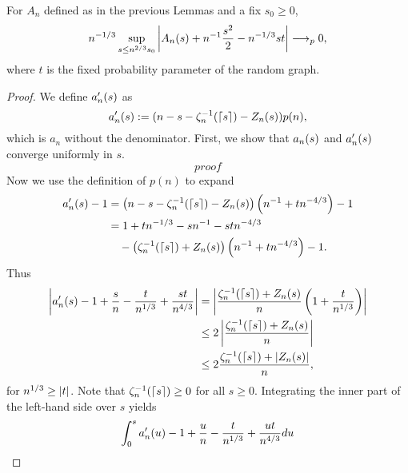 \begin{lemma} \label{L: limit An}
	For $A_n$ defined as in the previous Lemmas and a fix $s_0 \geq 0$,
	\begin{equation} \label{E: limit An}
	n^{-1 / 3} \sup_{s \leq n^{2 / 3} s_0 } \left| A_n(s) + n^{-1}\frac{s^2}{2} - n^{-1 / 3}st \right| \longrightarrow_p 0,
	\end{equation}
	where $t$ is the fixed probability parameter of the random graph.
\end{lemma}
\begin{proof} \label{P: limit An}
	We define $a'_n(s)$ as
	\begin{equation}
		a'_n(s) := (n - s - \zeta^{-1}_n(\lceil s\rceil) - Z_n(s)) p(n),
	\end{equation}
	which is $a_n$ without the denominator.
	First, we show that $a_n(s)$ and $a'_n(s)$ converge uniformly in $s$.
	\begin{equation}
	proof
	\end{equation}
	Now we use the definition of $p(n)$ to expand
	\begin{align*}
	a'_n(s) - 1 
	&= \left( n - s - \zeta^{-1}_n(\lceil s\rceil) - Z_n(s) \right) \left( n^{-1} + tn^{-4 / 3} \right) - 1 \\
	&= 1 + tn^{-1 / 3} - sn^{-1} - stn^{-4 / 3} \\
	&\quad - \left( \zeta^{-1}_n(\lceil s\rceil) + Z_n(s) \right) \left( n^{-1} + tn^{-4 / 3} \right) -1 .
	\end{align*}
	Thus
	\begin{equation} \label{E: (27)} 
	\begin{aligned}
	\left| a'_n(s) - 1 + \frac{s}{n} - \frac{t}{n^{1 / 3}} + \frac{st}{n^{4 / 3}} \right|
	&= \left| \frac{\zeta^{-1}_n(\lceil s\rceil) + Z_n(s)}{n} \left( 1 + \frac{t}{n^{1 / 3}} \right) \right| \\
	&\leq 2 \left| \frac{\zeta^{-1}_n(\lceil s\rceil) + Z_n(s)}{n} \right| \\
	&\leq 2 \frac{\zeta^{-1}_n(\lceil s\rceil) + |Z_n(s)|}{n} ,  
	\end{aligned}
	\end{equation}
	for $n^{1 / 3} \geq |t|$. Note that $\zeta^{-1}_n(\lceil s\rceil) \geq 0$ for all $s \geq 0$.
	Integrating the inner part of the left-hand side over $s$ yields
	\begin{align*}
	\int_{0}^{s} \amn{u} - 1 + \frac{u}{n} - \frac{t}{\n{1}{3}} + \frac{ut}{\n{4}{3}} du

\end{align*}
\end{proof}
